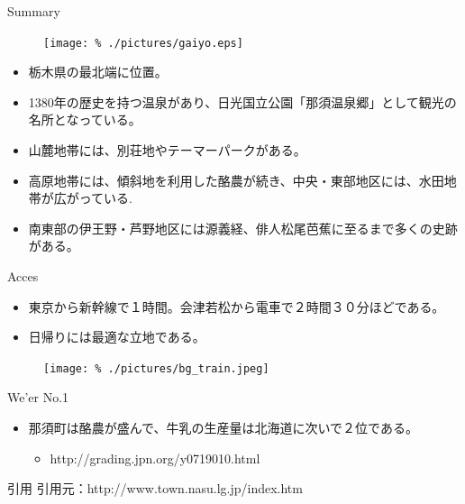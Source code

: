 \documentclass[]{beamer}
\begin{document}
\normalsize


\begin{frame}{Summary}
  \begin{figure}[gaiyo]
    \begin{center}
    \texttt{[image: \%
      ./pictures/gaiyo.eps]}
    \end{center}
  \end{figure}
  \begin{itemize}
  \item 栃木県の最北端に位置。\\
  \item 1380年の歴史を持つ温泉があり、日光国立公園「那須温泉郷」として観光の名所となっている。\\
  \item 山麓地帯には、別荘地やテーマーパークがある。\\
  \item 高原地帯には、傾斜地を利用した酪農が続き、中央・東部地区には、水田地帯が広がっている.\\
  \item 南東部の伊王野・芦野地区には源義経、俳人松尾芭蕉に至るまで多くの史跡がある。\\
  \end{itemize}
\end{frame}

\begin{frame}{Acces}
  \begin{itemize}
  \item 東京から新幹線で１時間。会津若松から電車で２時間３０分ほどである。\\
  \item 日帰りには最適な立地である。\\
  \end{itemize}
   \begin{figure}[map]
    \begin{center}
    \texttt{[image: \%
      ./pictures/bg\_train.jpeg]}
    \end{center}
  \end{figure}
\end{frame}

\begin{frame}{We'er No.1}
  \begin{itemize}
  \item 那須町は酪農が盛んで、牛乳の生産量は北海道に次いで２位である。\\
    \begin{itemize}
    \item http://grading.jpn.org/y0719010.html\\
    \end{itemize}
  \end{itemize}
\end{frame}

\begin{frame}{引用}
  引用元：http://www.town.nasu.lg.jp/index.htm\\
\end{frame}
\end{document}
